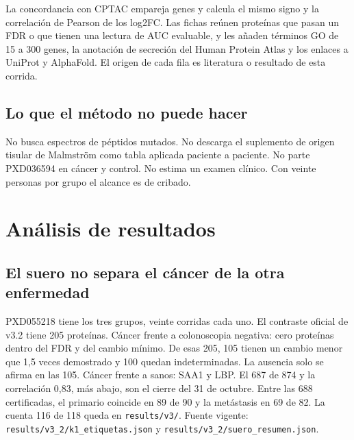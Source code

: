 \documentclass[12pt,oneside]{report}
\begin{document}
La concordancia con CPTAC empareja genes y calcula el mismo signo y la correlación de Pearson de los log2FC. Las fichas reúnen proteínas que pasan un FDR o que tienen una lectura de AUC evaluable, y les añaden términos GO de 15 a 300 genes, la anotación de secreción del Human Protein Atlas y los enlaces a UniProt y AlphaFold. El origen de cada fila es literatura o resultado de esta corrida.

\section{Lo que el método no puede hacer}
No busca espectros de péptidos mutados. No descarga el suplemento de origen tisular de Malmström como tabla aplicada paciente a paciente. No parte PXD036594 en cáncer y control. No estima un examen clínico. Con veinte personas por grupo el alcance es de cribado.

\chapter{Análisis de resultados}
\section{El suero no separa el cáncer de la otra enfermedad}
PXD055218 tiene los tres grupos, veinte corridas cada uno. El contraste oficial de v3.2 tiene 205 proteínas. Cáncer frente a colonoscopia negativa: cero proteínas dentro del FDR y del cambio mínimo. De esas 205, 105 tienen un cambio menor que 1,5 veces demostrado y 100 quedan indeterminadas. La ausencia solo se afirma en las 105. Cáncer frente a sanos: SAA1 y LBP. El 687 de 874 y la correlación 0,83, más abajo, son el cierre del 31 de octubre. Entre las 688 certificadas, el primario coincide en 89 de 90 y la metástasis en 69 de 82. La cuenta 116 de 118 queda en \texttt{results/v3/}. Fuente vigente: \texttt{results/v3\_2/k1\_etiquetas.json} y \texttt{results/v3\_2/suero\_resumen.json}.
\end{document}
